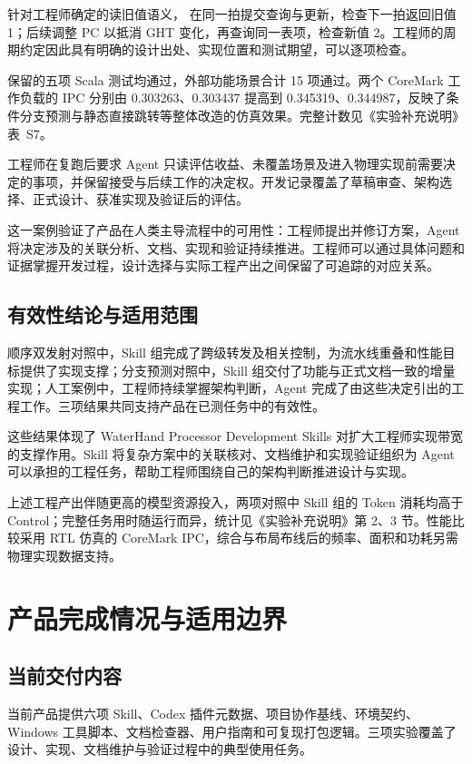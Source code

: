 \documentclass[UTF8,fontset=none,zihao=-4,a4paper]{ctexart}
\begin{document}
针对工程师确定的读旧值语义， 在同一拍提交查询与更新，检查下一拍返回旧值 1；后续调整 PC 以抵消 GHT 变化，再查询同一表项，检查新值 2。工程师的周期约定因此具有明确的设计出处、实现位置和测试期望，可以逐项检查。

保留的五项 Scala 测试均通过，外部功能场景合计 15 项通过。两个 CoreMark 工作负载的 IPC 分别由 0.303263、0.303437 提高到 0.345319、0.344987，反映了条件分支预测与静态直接跳转等整体改造的仿真效果。完整计数见《实验补充说明》表~S7。

工程师在复跑后要求 Agent 只读评估收益、未覆盖场景及进入物理实现前需要决定的事项，并保留接受与后续工作的决定权。开发记录覆盖了草稿审查、架构选择、正式设计、获准实现及验证后的评估。

这一案例验证了产品在人类主导流程中的可用性：工程师提出并修订方案，Agent 将决定涉及的关联分析、文档、实现和验证持续推进。工程师可以通过具体问题和证据掌握开发过程，设计选择与实际工程产出之间保留了可追踪的对应关系。

\subsection{有效性结论与适用范围}

顺序双发射对照中，Skill 组完成了跨级转发及相关控制，为流水线重叠和性能目标提供了实现支撑；分支预测对照中，Skill 组交付了功能与正式文档一致的增量实现；人工案例中，工程师持续掌握架构判断，Agent 完成了由这些决定引出的工程工作。三项结果共同支持产品在已测任务中的有效性。

这些结果体现了 WaterHand Processor Development Skills 对扩大工程师实现带宽的支撑作用。Skill 将复杂方案中的关联核对、文档维护和实现验证组织为 Agent 可以承担的工程任务，帮助工程师围绕自己的架构判断推进设计与实现。

上述工程产出伴随更高的模型资源投入，两项对照中 Skill 组的 Token 消耗均高于 Control；完整任务用时随运行而异，统计见《实验补充说明》第 2、3 节。性能比较采用 RTL 仿真的 CoreMark IPC，综合与布局布线后的频率、面积和功耗另需物理实现数据支持。


\section{产品完成情况与适用边界}

\subsection{当前交付内容}

当前产品提供六项 Skill、Codex 插件元数据、项目协作基线、环境契约、Windows 工具脚本、文档检查器、用户指南和可复现打包逻辑。三项实验覆盖了设计、实现、文档维护与验证过程中的典型使用任务。
\end{document}
